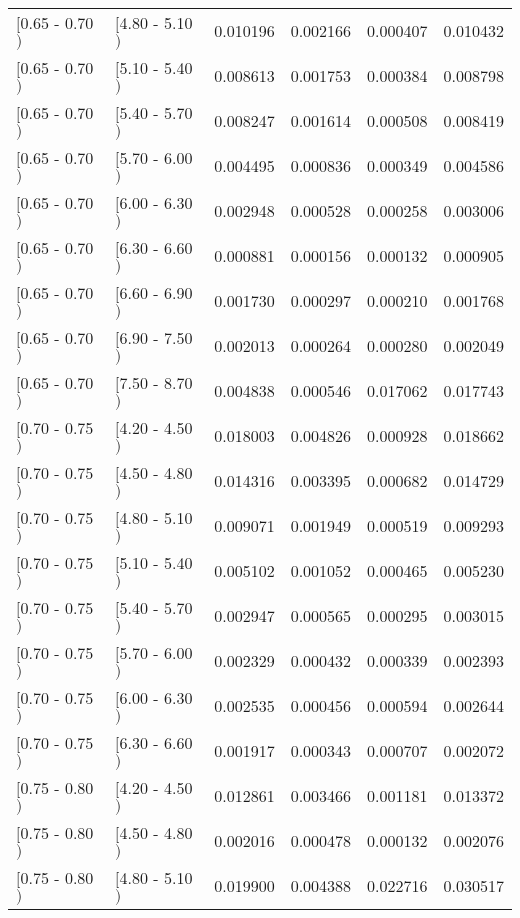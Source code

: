 \begin{longtable}{| l | l | r | r | r | r |}
$[$0.65 - 0.70$)$ & $[$4.80 - 5.10$)$ & 0.010196 & 0.002166 & 0.000407 & 0.010432 \\
$[$0.65 - 0.70$)$ & $[$5.10 - 5.40$)$ & 0.008613 & 0.001753 & 0.000384 & 0.008798 \\
$[$0.65 - 0.70$)$ & $[$5.40 - 5.70$)$ & 0.008247 & 0.001614 & 0.000508 & 0.008419 \\
$[$0.65 - 0.70$)$ & $[$5.70 - 6.00$)$ & 0.004495 & 0.000836 & 0.000349 & 0.004586 \\
$[$0.65 - 0.70$)$ & $[$6.00 - 6.30$)$ & 0.002948 & 0.000528 & 0.000258 & 0.003006 \\
$[$0.65 - 0.70$)$ & $[$6.30 - 6.60$)$ & 0.000881 & 0.000156 & 0.000132 & 0.000905 \\
$[$0.65 - 0.70$)$ & $[$6.60 - 6.90$)$ & 0.001730 & 0.000297 & 0.000210 & 0.001768 \\
$[$0.65 - 0.70$)$ & $[$6.90 - 7.50$)$ & 0.002013 & 0.000264 & 0.000280 & 0.002049 \\
$[$0.65 - 0.70$)$ & $[$7.50 - 8.70$)$ & 0.004838 & 0.000546 & 0.017062 & 0.017743 \\
$[$0.70 - 0.75$)$ & $[$4.20 - 4.50$)$ & 0.018003 & 0.004826 & 0.000928 & 0.018662 \\
$[$0.70 - 0.75$)$ & $[$4.50 - 4.80$)$ & 0.014316 & 0.003395 & 0.000682 & 0.014729 \\
$[$0.70 - 0.75$)$ & $[$4.80 - 5.10$)$ & 0.009071 & 0.001949 & 0.000519 & 0.009293 \\
$[$0.70 - 0.75$)$ & $[$5.10 - 5.40$)$ & 0.005102 & 0.001052 & 0.000465 & 0.005230 \\
$[$0.70 - 0.75$)$ & $[$5.40 - 5.70$)$ & 0.002947 & 0.000565 & 0.000295 & 0.003015 \\
$[$0.70 - 0.75$)$ & $[$5.70 - 6.00$)$ & 0.002329 & 0.000432 & 0.000339 & 0.002393 \\
$[$0.70 - 0.75$)$ & $[$6.00 - 6.30$)$ & 0.002535 & 0.000456 & 0.000594 & 0.002644 \\
$[$0.70 - 0.75$)$ & $[$6.30 - 6.60$)$ & 0.001917 & 0.000343 & 0.000707 & 0.002072 \\
$[$0.75 - 0.80$)$ & $[$4.20 - 4.50$)$ & 0.012861 & 0.003466 & 0.001181 & 0.013372 \\
$[$0.75 - 0.80$)$ & $[$4.50 - 4.80$)$ & 0.002016 & 0.000478 & 0.000132 & 0.002076 \\
$[$0.75 - 0.80$)$ & $[$4.80 - 5.10$)$ & 0.019900 & 0.004388 & 0.022716 & 0.030517 \\
\end{longtable}